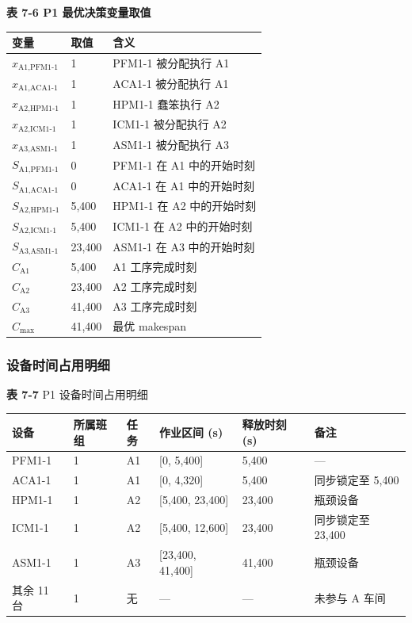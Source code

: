 \documentclass[UTF8,a4paper,12pt]{ctexart}
\begin{document}
\begin{center}
\textbf{{表 7-6} P1 最优决策变量取值}
\begin{tabular}{lll}
\toprule
变量 & 取值 & 含义 \\
\midrule
$x_{\text{A1},\text{PFM1-1}}$ & 1 & PFM1-1 被分配执行 A1 \\
$x_{\text{A1},\text{ACA1-1}}$ & 1 & ACA1-1 被分配执行 A1 \\
$x_{\text{A2},\text{HPM1-1}}$ & 1 & HPM1-1 蠢笨执行 A2 \\
$x_{\text{A2},\text{ICM1-1}}$ & 1 & ICM1-1 被分配执行 A2 \\
$x_{\text{A3},\text{ASM1-1}}$ & 1 & ASM1-1 被分配执行 A3 \\
$S_{\text{A1},\text{PFM1-1}}$ & 0 & PFM1-1 在 A1 中的开始时刻 \\
$S_{\text{A1},\text{ACA1-1}}$ & 0 & ACA1-1 在 A1 中的开始时刻 \\
$S_{\text{A2},\text{HPM1-1}}$ & 5,400 & HPM1-1 在 A2 中的开始时刻 \\
$S_{\text{A2},\text{ICM1-1}}$ & 5,400 & ICM1-1 在 A2 中的开始时刻 \\
$S_{\text{A3},\text{ASM1-1}}$ & 23,400 & ASM1-1 在 A3 中的开始时刻 \\
$C_{\text{A1}}$ & 5,400 & A1 工序完成时刻 \\
$C_{\text{A2}}$ & 23,400 & A2 工序完成时刻 \\
$C_{\text{A3}}$ & 41,400 & A3 工序完成时刻 \\
$C_{\max}$ & 41,400 & 最优 makespan \\
\bottomrule
\end{tabular}
\end{center}

\subsubsection{设备时间占用明细}
\begin{center}
\textbf{表 7-7} P1 设备时间占用明细
\begin{tabular}{llllll}
\toprule
设备 & 所属班组 & 任务 & 作业区间 (s) & 释放时刻 (s) & 备注 \\
\midrule
PFM1-1 & 1 & A1 & [0, 5,400] & 5,400 & — \\
ACA1-1 & 1 & A1 & [0, 4,320] & 5,400 & 同步锁定至 5,400 \\
HPM1-1 & 1 & A2 & [5,400, 23,400] & 23,400 & 瓶颈设备 \\
ICM1-1 & 1 & A2 & [5,400, 12,600] & 23,400 & 同步锁定至 23,400 \\
ASM1-1 & 1 & A3 & [23,400, 41,400] & 41,400 & 瓶颈设备 \\
其余 11 台 & 1 & 无 & — & — & 未参与 A 车间 \\
\bottomrule
\end{tabular}
\end{center}
\end{document}

